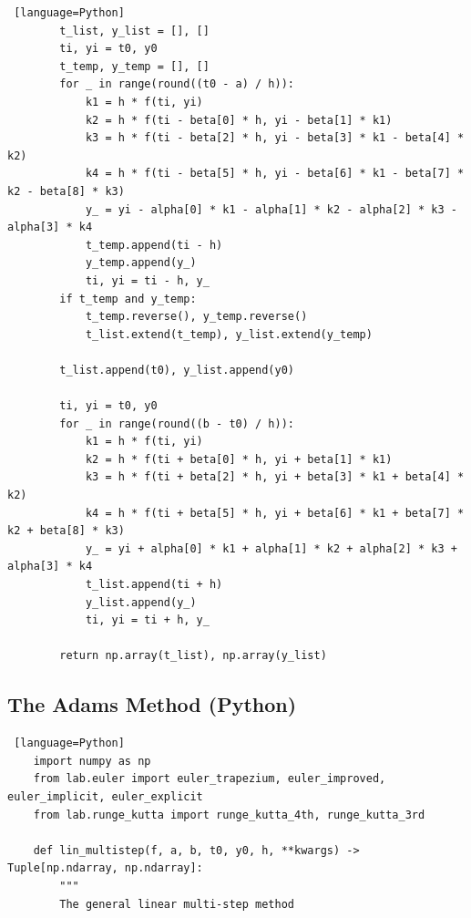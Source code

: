 \documentclass[a4paper]{article}
\begin{document}
\begin{appendices}
\begin{lstlisting} [language=Python]
        t_list, y_list = [], []
        ti, yi = t0, y0
        t_temp, y_temp = [], []
        for _ in range(round((t0 - a) / h)):
            k1 = h * f(ti, yi)
            k2 = h * f(ti - beta[0] * h, yi - beta[1] * k1)
            k3 = h * f(ti - beta[2] * h, yi - beta[3] * k1 - beta[4] * k2)
            k4 = h * f(ti - beta[5] * h, yi - beta[6] * k1 - beta[7] * k2 - beta[8] * k3)
            y_ = yi - alpha[0] * k1 - alpha[1] * k2 - alpha[2] * k3 - alpha[3] * k4
            t_temp.append(ti - h)
            y_temp.append(y_)
            ti, yi = ti - h, y_
        if t_temp and y_temp:
            t_temp.reverse(), y_temp.reverse()
            t_list.extend(t_temp), y_list.extend(y_temp)
    
        t_list.append(t0), y_list.append(y0)
    
        ti, yi = t0, y0
        for _ in range(round((b - t0) / h)):
            k1 = h * f(ti, yi)
            k2 = h * f(ti + beta[0] * h, yi + beta[1] * k1)
            k3 = h * f(ti + beta[2] * h, yi + beta[3] * k1 + beta[4] * k2)
            k4 = h * f(ti + beta[5] * h, yi + beta[6] * k1 + beta[7] * k2 + beta[8] * k3)
            y_ = yi + alpha[0] * k1 + alpha[1] * k2 + alpha[2] * k3 + alpha[3] * k4
            t_list.append(ti + h)
            y_list.append(y_)
            ti, yi = ti + h, y_
    
        return np.array(t_list), np.array(y_list)

    \end{lstlisting}
    
    \clearpage
    
    \subsection{The Adams Method (Python)}
    
    \begin{lstlisting} [language=Python]
    import numpy as np
    from lab.euler import euler_trapezium, euler_improved, euler_implicit, euler_explicit
    from lab.runge_kutta import runge_kutta_4th, runge_kutta_3rd

    def lin_multistep(f, a, b, t0, y0, h, **kwargs) -> Tuple[np.ndarray, np.ndarray]:
        """
        The general linear multi-step method
    

\end{lstlisting}
\end{appendices}
\end{document}
